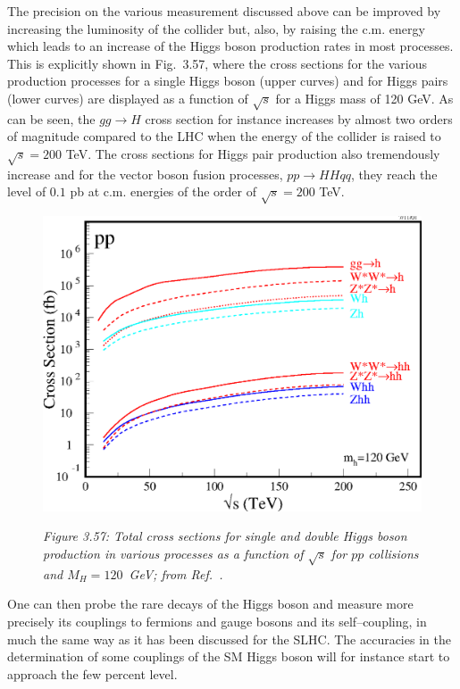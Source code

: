 The precision on the various measurement discussed above can be improved by
increasing the luminosity of the collider but, also, by raising the c.m. energy
which leads to an increase of the Higgs boson production rates in most
processes.  This is explicitly shown in Fig.~3.57, where the cross sections for
the various production processes for a single Higgs boson (upper curves) and
for Higgs pairs (lower curves) are displayed as a function of $\sqrt{s}$ for a
Higgs  mass of 120 GeV. As can be seen, the $gg\to H$ cross section for
instance increases by almost two orders of magnitude compared to the LHC when
the energy of the collider is raised to $\sqrt{s}=200$ TeV. The cross
sections for Higgs pair production also tremendously increase and for the
vector boson fusion processes, $pp \to HHqq$, they reach the level of 
$0.1$ pb at c.m. energies of the order of $\sqrt{s}=200$ TeV.

\begin{figure}[!h]
\begin{center}
\vspace*{3mm}
\includegraphics[width=4.in]{./sm3/VLHC-xsections.eps}
\end{center}
\vspace*{-2mm}
{\it Figure 3.57: Total cross sections for single and double Higgs boson 
production in various processes as a function of $\sqrt{s}$ for $pp$ 
collisions and $M_H=120$~GeV; from Ref.~\cite{SLHC+VLHC}.}
\vspace*{-1mm}
\end{figure}

One can then probe the rare decays of the Higgs boson and measure more precisely
its couplings to fermions and gauge bosons and its self--coupling, in much the
same way as it has been discussed for the SLHC. The accuracies in the
determination of some couplings of the SM Higgs boson will for instance start
to approach the few percent level.\s 


